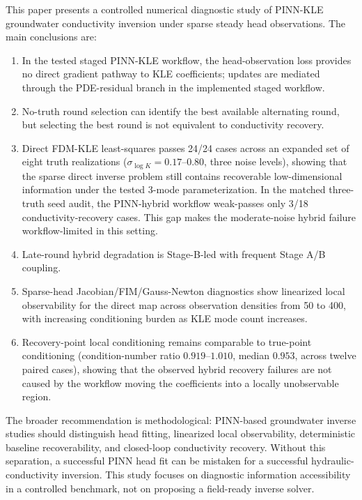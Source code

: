 \documentclass[pdflatex,sn-mathphys,Numbered,iicol]{sn-jnl}
\begin{document}
This paper presents a controlled numerical diagnostic study of PINN-KLE
groundwater conductivity inversion under sparse steady head observations. The
main conclusions are:
\begin{enumerate}
\item In the tested staged PINN-KLE workflow, the head-observation loss
  provides no direct gradient pathway to KLE coefficients; updates are mediated
  through the PDE-residual branch in the implemented staged workflow.
\item No-truth round selection can identify the best available alternating
  round, but selecting the best round is not equivalent to conductivity
  recovery.
\item Direct FDM-KLE least-squares passes 24/24 cases across an expanded set of
  eight truth realizations ($\sigma_{\log K}=0.17$--$0.80$, three noise levels),
  showing that the sparse direct inverse problem still contains recoverable
  low-dimensional information under the tested 3-mode parameterization. In the
  matched three-truth seed audit, the PINN-hybrid workflow weak-passes only
  3/18 conductivity-recovery cases. This gap makes the moderate-noise hybrid
  failure workflow-limited in this setting.
\item Late-round hybrid degradation is Stage-B-led with frequent Stage A/B
  coupling.
\item Sparse-head Jacobian/FIM/Gauss-Newton diagnostics show linearized local
  observability for the direct map across observation densities from 50 to 400,
  with increasing conditioning burden as KLE mode count increases.
\item Recovery-point local conditioning remains comparable to true-point
  conditioning (condition-number ratio $0.919$--$1.010$, median $0.953$, across twelve paired
  cases), showing that the observed hybrid recovery failures are not caused
  by the workflow moving the coefficients into a locally unobservable region.
\end{enumerate}

The broader recommendation is methodological: PINN-based groundwater inverse
studies should distinguish head fitting, linearized local observability,
deterministic baseline recoverability, and closed-loop conductivity recovery.
Without this separation, a successful PINN head fit can be mistaken for a
successful hydraulic-conductivity inversion. This study focuses on diagnostic
information accessibility in a controlled benchmark, not on proposing a
field-ready inverse solver.
\end{document}
